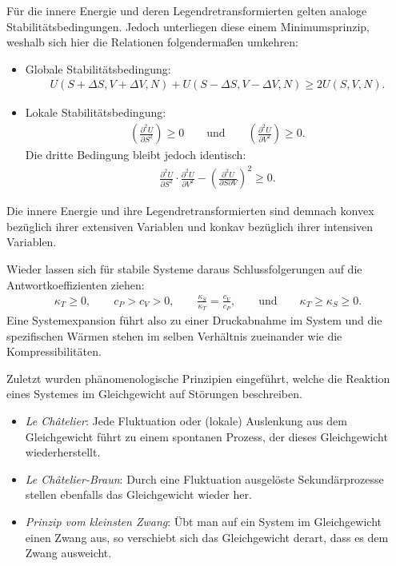 \begin{summary}
	Für die innere Energie und deren Legendretransformierten gelten analoge Stabilitätsbedingungen. Jedoch unterliegen diese einem Minimumsprinzip, weshalb sich hier die Relationen folgendermaßen umkehren:
	\begin{itemize}
		\item Globale Stabilitätsbedingung: 
		\begin{align*}
			U(S+\Delta S, V+\Delta V,N)+U(S-\Delta S, V-\Delta V,N)\geq2U(S,V,N).
		\end{align*}
		\item Lokale Stabilitätsbedingung:
		\begin{align*}
			\left(\frac{\partial^2U}{\partial S^2}\right)\geq 0\qquad \mathrm{und} \qquad \left(\frac{\partial^2U}{\partial V^2}\right)\geq 0.
		\end{align*}
		Die dritte Bedingung bleibt jedoch identisch:
		\begin{align*}
			\frac{\partial ^2U}{\partial S^2}\cdot\frac{\partial ^2U}{\partial V^2}-\left(\frac{\partial ^2U}{\partial S\partial V}\right)^2\geq 0.
		\end{align*}
	\end{itemize} 
	Die innere Energie und ihre Legendretransformierten sind demnach konvex bezüglich ihrer extensiven Variablen und konkav bezüglich ihrer intensiven Variablen.

	Wieder lassen sich für stabile Systeme daraus Schlussfolgerungen auf die Antwortkoeffizienten ziehen:
	\begin{align*}
		\kappa_T\geq 0, \qquad c_P>c_V>0, \qquad \frac{\kappa_S}{\kappa_T}=\frac{c_V}{c_P}, \qquad \mathrm{und} \qquad \kappa_T\geq\kappa_S\geq 0.
	\end{align*}
	Eine Systemexpansion führt also zu einer Druckabnahme im System und die spezifischen Wärmen stehen im selben Verhältnis zueinander wie die Kompressibilitäten.

	Zuletzt wurden phänomenologische Prinzipien eingeführt, welche die Reaktion eines Systemes im Gleichgewicht auf Störungen beschreiben.
	\begin{itemize}
		\item \emph{Le Châtelier}: Jede Fluktuation oder (lokale) Auslenkung aus dem Gleichgewicht führt zu einem
		spontanen Prozess, der dieses Gleichgewicht wiederherstellt.
		\item \emph{Le Châtelier-Braun}: Durch eine Fluktuation ausgelöste Sekundärprozesse stellen ebenfalls das
		Gleichgewicht wieder her.
		\item \emph{Prinzip vom kleinsten Zwang}: Übt man auf ein System im Gleichgewicht einen Zwang aus, so verschiebt sich das Gleichgewicht derart, dass es dem Zwang ausweicht.
	\end{itemize}
\end{summary}
